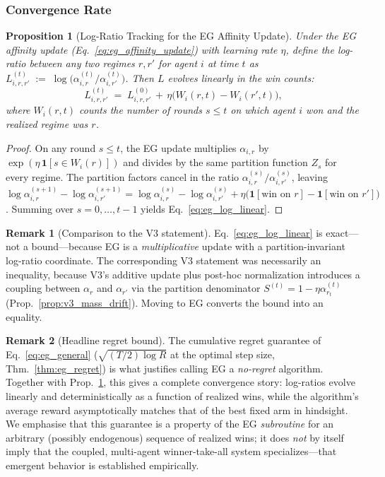 \documentclass[11pt,a4paper]{article}
\theoremstyle{definition}
\newtheorem{remark}{Remark}[section]
\theoremstyle{plain}
\newtheorem{proposition}{Proposition}[section]
\begin{document}
\subsubsection{Convergence Rate}

\begin{proposition}[Log-Ratio Tracking for the EG Affinity Update]
\label{prop:eg_log_ratio}
Under the EG affinity update (Eq.~\eqref{eq:eg_affinity_update}) with
learning rate $\eta$, define the log-ratio between any two regimes
$r, r'$ for agent $i$ at time $t$ as
$L_{i,r,r'}^{(t)} \;:=\; \log\!\bigl(\alpha_{i,r}^{(t)} / \alpha_{i,r'}^{(t)}\bigr)$.
Then $L$ evolves linearly in the win counts:
\begin{equation}
\label{eq:eg_log_linear}
L_{i,r,r'}^{(t)}
\;=\;
L_{i,r,r'}^{(0)} \,+\, \eta\bigl(W_i(r,t) - W_i(r',t)\bigr),
\end{equation}
where $W_i(r,t)$ counts the number of rounds $s \leq t$ on which agent
$i$ won and the realized regime was $r$.
\end{proposition}

\begin{proof}
On any round $s \leq t$, the EG update multiplies $\alpha_{i,r}$ by
$\exp(\eta\,\mathbf{1}[s \in W_i(r)])$ and divides by the same
partition function $Z_s$ for every regime. The partition factors
cancel in the ratio $\alpha_{i,r}^{(s)}/\alpha_{i,r'}^{(s)}$, leaving
$\log\alpha_{i,r}^{(s+1)} - \log\alpha_{i,r'}^{(s+1)}
= \log\alpha_{i,r}^{(s)} - \log\alpha_{i,r'}^{(s)}
+ \eta\bigl(\mathbf{1}[\text{win on }r] - \mathbf{1}[\text{win on }r']\bigr)$.
Summing over $s = 0, \ldots, t-1$ yields Eq.~\eqref{eq:eg_log_linear}.
\end{proof}

\begin{remark}[Comparison to the V3 statement]
Eq.~\eqref{eq:eg_log_linear} is exact---not a bound---because EG is a
\emph{multiplicative} update with a partition-invariant log-ratio
coordinate. The corresponding V3 statement was necessarily an
inequality, because V3's additive update plus post-hoc normalization
introduces a coupling between $\alpha_r$ and $\alpha_{r'}$ via the
partition denominator $S^{(t)} = 1 - \eta\alpha^{(t)}_{r_t}$
(Prop.~\ref{prop:v3_mass_drift}). Moving to EG converts the bound into
an equality.
\end{remark}

\begin{remark}[Headline regret bound]
The cumulative regret guarantee of Eq.~\eqref{eq:eg_general}
($\sqrt{(T/2)\log R}$ at the optimal step size, Thm.~\ref{thm:eg_regret})
is what justifies calling EG a \emph{no-regret} algorithm. Together with
Prop.~\ref{prop:eg_log_ratio}, this gives a complete convergence story:
log-ratios evolve linearly and deterministically as a function of
realized wins, while the algorithm's average reward asymptotically
matches that of the best fixed arm in hindsight. We emphasise that this
guarantee is a property of the EG \emph{subroutine} for an arbitrary
(possibly endogenous) sequence of realized wins; it does \emph{not} by
itself imply that the coupled, multi-agent winner-take-all system
specializes---that emergent behavior is established empirically.
\end{remark}
\end{document}
